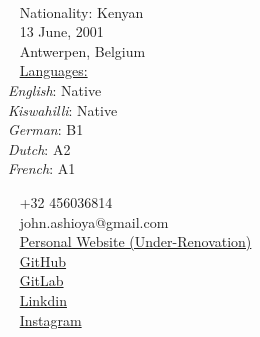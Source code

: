 \documentclass{modernsimplecv}
\begin{document}
\begin{minipage}[t]{0.77\textwidth}
\vspace{0pt} %
\begin{shaded*}

\begin{minipage}[t]{0.4\textwidth}
\vspace{0pt} %
{\par\centering\huge{}} \\[0.3cm]
\faGlobe~ Nationality: Kenyan\\
\faBirthdayCake~ 13 June, 2001 \\
\faMapMarker~ Antwerpen, Belgium\\

{\small
\faCommentsO~ \underline{Languages:} \\ 
\emph{English}: Native \\ 
\emph{Kiswahilli}: Native \\ 
\emph{German}: B1 \\ 
\emph{Dutch}: A2\\
\emph{French}: A1\\}
\end{minipage}\hfill
\begin{minipage}[t]{0.55\textwidth}
\vspace{0pt} %
\faPhone~ +32 456036814 \\
\faAt~ {john.ashioya@gmail.com} \\


\faFont~ \href{https://pashioya.com }{Personal Website (Under-Renovation)} \\
\faGithub~ \href{https://github.com/pashioya}{GitHub} \\
\faGithub~ \href{https://gitlab.com/pashioya}{GitLab} \\
\faLinkedin~ \href{https://linkedin.com/in/paul-ashioya-1b1023153/}{Linkdin} \\
\faInstagram~ \href{https://instagram.com/paul.ashioya}{Instagram} \\


\end{minipage}
\hfill
\end{shaded*}
\end{minipage}\\[15pt]
\end{document}
